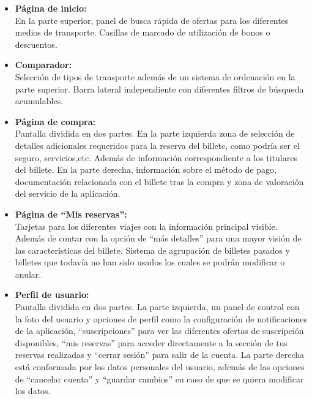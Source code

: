 \begin{itemize}
    \item\textbf{Página de inicio:} \\ En la parte superior, panel de busca rápida de ofertas para los diferentes medios de transporte. 
    Casillas de marcado de utilización de bonos o descuentos. 
    
    \item\textbf{Comparador:} \\ Selección de tipos de transporte además de un sistema de ordenación en la parte superior.
    Barra lateral independiente con diferentes filtros de búsqueda acumulables.
    
    \item\textbf{Página de compra:} \\ Pantalla dividida en dos partes. En la parte izquierda zona de selección de detalles adicionales requeridos para la reserva del billete, como podría ser el seguro, servicios,etc. Además de información correspondiente a los titulares del billete.
    En la parte derecha, información sobre el método de pago, documentación relacionada con el billete tras la compra y zona de valoración del servicio de la aplicación.
    
    \item\textbf{Página de ``Mis reservas'':} \\ Tarjetas para los diferentes viajes con la información principal visible. Además de contar con la opción de ``más detalles'' para una mayor visión de las características del billete.
    Sistema de agrupación de billetes pasados y billetes que todavía no han sido usados los cuales se podrán modificar o anular.
    
    \item\textbf{Perfil de usuario:} \\ Pantalla dividida en dos partes. La parte izquierda, un panel de control con la foto del usuario y opciones de perfil como la configuración de notificaciones de la aplicación, ``suscripciones'' para ver las diferentes ofertas de suscripción disponibles, ``mis reservas'' para acceder directamente a la sección de tus reservas realizadas y ``cerrar sesión'' para salir de la cuenta.
    La parte derecha está conformada por los datos personales del usuario, además de las opciones de ``cancelar cuenta'' y ``guardar cambios'' en caso de que se quiera modificar los datos.
    
\end{itemize}

